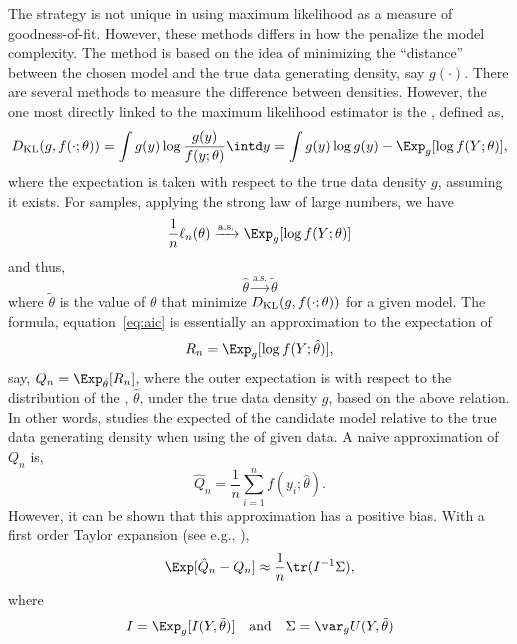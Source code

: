 The \aic strategy is not unique in using maximum likelihood as a measure of
goodness-of-fit. However, these methods differs in how the penalize the model
complexity. The \aic method is based on the idea of minimizing the
``distance'' between the chosen model and the true data generating density,
say $g(\cdot)$. There are several methods to measure the difference between
densities. However, the one most directly linked to the maximum likelihood
estimator is the \kl, defined as,
\begin{equation}
  \dkl(g, f(\cdot;\theta))
  = \int g(y)\log\frac{g(y)}{f(y;\theta)}\intd y
  = \int g(y)\log g(y) - \Exp_g[\log f(Y;\theta)],
  \label{eq:kl}
\end{equation}
where the expectation is taken with respect to the true data density $g$,
assuming it exists. For \iid samples, applying the strong law of large
numbers, we have
\begin{equation}
  \frac{1}{n}\ell_n(\theta) \xrightarrow{\text{a.s.}}
  \Exp_g[\log f(Y;\theta)]
\end{equation}
and thus,
\begin{equation}
  \hat\theta \xrightarrow{\text{a.s.}} \tilde\theta
\end{equation}
where $\tilde\theta$ is the value of $\theta$ that minimize
$D_{\mathrm{KL}}(g,f(\cdot;\theta))$ for a given model. The \aic formula,
equation~\eqref{eq:aic} is essentially an approximation to the expectation of
\begin{equation}
  R_n = \Exp_g[\log f(Y;\hat\theta)],
\end{equation}
say, $Q_n = \Exp_{\hat\theta}[R_n]$, where the outer expectation is with
respect to the distribution of the \mle, $\hat\theta$, under the true data
density $g$, based on the above relation. In other words, \aic studies the
expected \kl of the candidate model relative to the true data generating
density when using the \mle of given data. A naive approximation of $Q_n$ is,
\begin{equation}
  \hat{Q}_n = \frac{1}{n} \sum_{i=1}^nf(y_i;\hat\theta).
\end{equation}
However, it can be shown that this approximation has a positive bias. With a
first order Taylor expansion (see e.g., \cite[][sec.~2.3]{Claeskens:2008tq}),
\begin{equation}
  \Exp[\hat{Q}_n - Q_n] \approx \frac{1}{n}\tr(I^{-1}\Sigma),
  \label{eq:aic Taylor}
\end{equation}
where
\begin{equation}
  I = \Exp_g[I(Y,\tilde\theta)]\quad\text{and}\quad
  \Sigma = \var_g U(Y,\tilde\theta)
  \label{eq:aic bias}
\end{equation}
